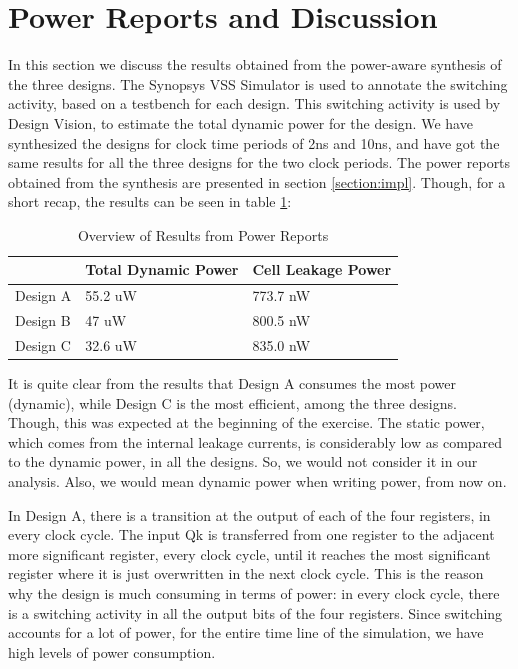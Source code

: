 \documentclass[11pt,a4paper]{article}
\begin{document}
\newpage
\section{Power Reports and Discussion}
\label{section:power}

In this section we discuss the results obtained from the power-aware synthesis of the three designs. The Synopsys VSS Simulator is used to annotate the switching activity, based on a testbench for each design. This switching activity is used by Design Vision, to estimate the total dynamic power for the design. We have synthesized the designs for clock time periods of 2ns and 10ns, and have got the same results for all the three designs for the two clock periods. The power reports obtained from the synthesis are presented in section \ref{section:impl}. Though, for a short recap, the results can be seen in table \ref{table:power}:

\begin{table}[htbp]
\begin{center}
\begin{tabular}{|l|l|l|}
\hline
\textbf{}	& \textbf{Total Dynamic Power}		& \textbf{Cell Leakage Power}\\ \hline
Design A &	55.2 uW				& 773.7 nW \\ \hline
Design B &	47 uW					& 800.5 nW \\ \hline
Design C &  32.6 uW				& 835.0 nW \\ \hline
\end{tabular}
\end{center}
\caption{Overview of Results from Power Reports}
\label{table:power}
\end{table}

It is quite clear from the results that Design A consumes the most power (dynamic), while Design C is the most efficient, among the three designs. Though, this was expected at the beginning of the exercise. The static power, which comes from the internal leakage currents, is considerably low as compared to the dynamic power, in all the designs. So, we would not consider it in our analysis. Also, we would mean dynamic power when writing power, from now on.

In Design A, there is a transition at the output of each of the four registers, in every clock cycle. The input Qk is transferred from one register to the adjacent more significant register, every clock cycle, until it reaches the most significant register where it is just overwritten in the next clock cycle. This is the reason why the design is much consuming in terms of power: in every clock cycle, there is a switching activity in all the output bits of the four registers. Since switching accounts for a lot of power, for the entire time line of the simulation, we have high levels of power consumption. 
\end{document}
